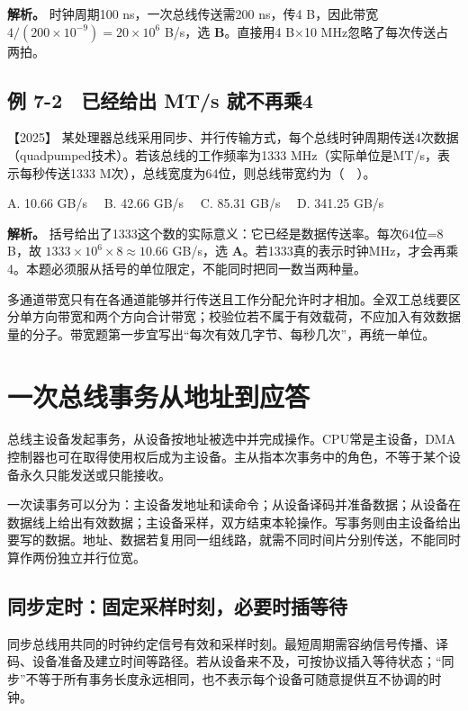 
\textbf{解析。} 时钟周期100 ns，一次总线传送需200 ns，传4 B，因此带宽 \(4/(200\times10^{-9})=20\times10^6\) B/s，选 \textbf{B}。直接用4 B×10 MHz忽略了每次传送占两拍。

\subsection{例 7-2　已经给出 MT/s 就不再乘4}\label{co-ex7-2}

\noindent{}【2025】 某处理器总线采用同步、并行传输方式，每个总线时钟周期传送4次数据（quadpumped技术）。若该总线的工作频率为1333 MHz（实际单位是MT/s，表示每秒传送1333 M次），总线宽度为64位，则总线带宽约为（　）。

A. 10.66 GB/s　 B. 42.66 GB/s　 C. 85.31 GB/s　 D. 341.25 GB/s


\textbf{解析。} 括号给出了1333这个数的实际意义：它已经是数据传送率。每次64位=8 B，故 \(1333\times10^6\times8\approx10.66\) GB/s，选 \textbf{A}。若1333真的表示时钟MHz，才会再乘4。本题必须服从括号的单位限定，不能同时把同一数当两种量。

多通道带宽只有在各通道能够并行传送且工作分配允许时才相加。全双工总线要区分单方向带宽和两个方向合计带宽；校验位若不属于有效载荷，不应加入有效数据量的分子。带宽题第一步宜写出``每次有效几字节、每秒几次''，再统一单位。

\section{一次总线事务从地址到应答}\label{co-07-02}

总线主设备发起事务，从设备按地址被选中并完成操作。CPU常是主设备，DMA控制器也可在取得使用权后成为主设备。主从指本次事务中的角色，不等于某个设备永久只能发送或只能接收。

一次读事务可以分为：主设备发地址和读命令；从设备译码并准备数据；从设备在数据线上给出有效数据；主设备采样，双方结束本轮操作。写事务则由主设备给出要写的数据。地址、数据若复用同一组线路，就需不同时间片分别传送，不能同时算作两份独立并行位宽。

\subsection{同步定时：固定采样时刻，必要时插等待}\label{co-c07-h39}

同步总线用共同的时钟约定信号有效和采样时刻。最短周期需容纳信号传播、译码、设备准备及建立时间等路径。若从设备来不及，可按协议插入等待状态；``同步''不等于所有事务长度永远相同，也不表示每个设备可随意提供互不协调的时钟。

